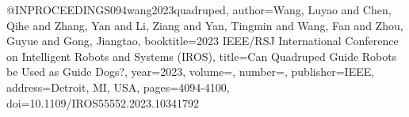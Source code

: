 @INPROCEEDINGS{094wang2023quadruped,
author={Wang, Luyao and Chen, Qihe and Zhang, Yan and Li, Ziang and Yan, Tingmin and Wang, Fan and Zhou, Guyue and Gong, Jiangtao},
booktitle={2023 IEEE/RSJ International Conference on Intelligent Robots and Systems (IROS)}, 
title={Can Quadruped Guide Robots be Used as Guide Dogs?}, 
year={2023},
volume={},
number={},
publisher={IEEE},
address={Detroit, MI, USA},
pages={4094-4100},
doi={10.1109/IROS55552.2023.10341792}
}